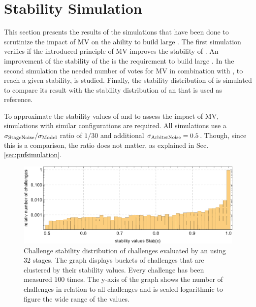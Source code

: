 \chapter{Stability Simulation}
\label{cap:stabilitysimulation}

This section presents the results of the simulations that have been done to scrutinize the impact of \ac{MV} on the ability to build large \mxpufs.
The first simulation verifies if the introduced principle of \ac{MV} improves the stability of \apuf.
An improvement of the stability of the \apufs is the requirement to build large \xpufs.
In the second simulation the needed number of votes for \ac{MV} in combination with \xpufs, to reach a given stability, is studied.
Finally, the stability distribution of \mxpufs is simulated to compare its result with the stability distribution of an \apuf that is used as reference.

To approximate the stability values of \pufs and to assess the impact of \ac{MV}, simulations with similar configurations are required.
All simulations use a $\sigma_{\mathrm{Stage Noise}}/\sigma_{\mathrm{Model}}$ ratio of $1/30$ and additional $\sigma_{\mathrm{Arbiter Noise}} = 0.5$.
Though, since this is a comparison, the ratio does not matter, as explained in Sec. \ref{sec:pufsimulation}.

\begin{figure}[!ht]
\includegraphics[width=1.00\textwidth]{images/arbiter-stability-distribution-simulation.eps}
\caption[Challenge stability distribution of an \apuf]{Challenge stability distribution of challenges evaluated by an \apuf using $32$ stages. 
The graph displays buckets of challenges that are clustered by their stability values.
Every challenge has been measured $100$ times. The y-axis of the graph shows the number of challenges in relation to all challenges and is scaled logarithmic to figure the wide range of the values.}  %
\label{fig:arbiterstabilitydistribution}
\end{figure}
\pagebreak

